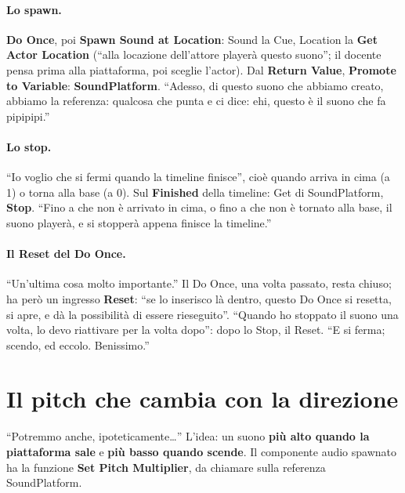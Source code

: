 \paragraph{Lo spawn.} \textbf{Do Once}, poi \textbf{Spawn Sound at Location}: Sound la
Cue, Location la \textbf{Get Actor Location} (``alla locazione dell'attore playerà questo
suono''; il docente pensa prima alla piattaforma, poi sceglie l'actor). Dal \textbf{Return
Value}, \textbf{Promote to Variable}: \textbf{SoundPlatform}. ``Adesso, di questo suono
che abbiamo creato, abbiamo la referenza: qualcosa che punta e ci dice: ehi, questo è il
suono che fa pipipipi.''

\paragraph{Lo stop.} ``Io voglio che si fermi quando la timeline finisce'', cioè quando
arriva in cima (a 1) o torna alla base (a 0). Sul \textbf{Finished} della timeline: Get
di SoundPlatform, \textbf{Stop}. ``Fino a che non è arrivato in cima, o fino a che non è
tornato alla base, il suono playerà, e si stopperà appena finisce la timeline.''

\paragraph{Il Reset del Do Once.} ``Un'ultima cosa molto importante.'' Il Do Once, una
volta passato, resta chiuso; ha però un ingresso \textbf{Reset}: ``se lo inserisco là
dentro, questo Do Once si resetta, si apre, e dà la possibilità di essere rieseguito''.
``Quando ho stoppato il suono una volta, lo devo riattivare per la volta dopo'': dopo lo
Stop, il Reset. ``E si ferma; scendo, ed eccolo. Benissimo.''

\section{Il pitch che cambia con la direzione}
\label{ue6:sec:pitch}

``Potremmo anche, ipoteticamente\ldots'' L'idea: un suono \textbf{più alto quando la
piattaforma sale} e \textbf{più basso quando scende}. Il componente audio spawnato ha la
funzione \textbf{Set Pitch Multiplier}, da chiamare sulla referenza SoundPlatform.

